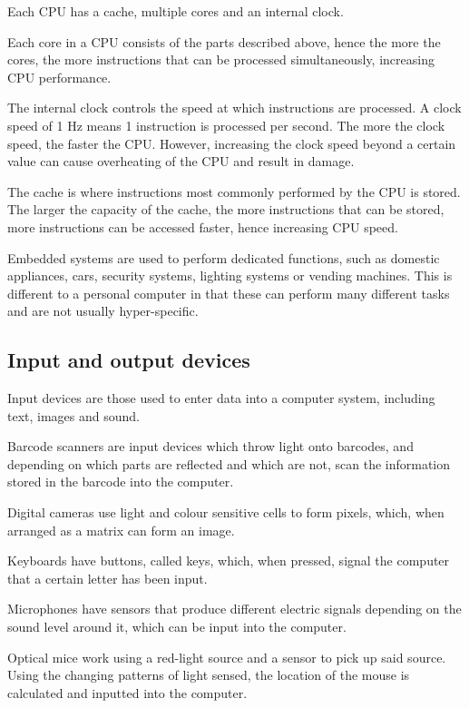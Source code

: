 Each CPU has a cache, multiple cores and an internal clock. 

Each core in a CPU consists of the 
parts described above, hence the more the cores, the more instructions that can be processed
simultaneously, increasing CPU performance.

The internal clock controls the speed at which instructions are processed. A clock speed of 1 Hz
means 1 instruction is processed per second. The more the clock speed, the faster the CPU. However,
increasing the clock speed beyond a certain value can cause overheating of the CPU and result in
damage.

The cache is where instructions most commonly performed by the CPU is stored. The larger the 
capacity of the cache, the more instructions that can be stored, more instructions can be accessed
faster, hence increasing CPU speed.

Embedded systems are used to perform dedicated functions, such as domestic appliances, cars, 
security systems, lighting systems or vending machines. This is different to a personal 
computer in that these can perform many different tasks and are not usually hyper-specific.

\subsection{Input and output devices}

Input devices are those used to enter data into a computer system, including text, images and 
sound.

Barcode scanners are input devices which throw light onto barcodes, and depending on which parts
are reflected and which are not, scan the information stored in the barcode into the computer.

Digital cameras use light and colour sensitive cells to form pixels, which, when arranged as a
matrix can form an image.

Keyboards have buttons, called keys, which, when pressed, signal the computer that a certain letter
has been input.

Microphones have sensors that produce different electric signals depending on the sound level 
around it, which can be input into the computer.

Optical mice work using a red-light source and a sensor to pick up said source. Using the changing
patterns of light sensed, the location of the mouse is calculated and inputted into the computer.

